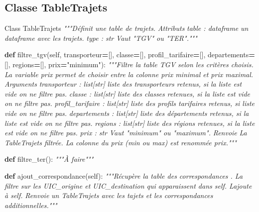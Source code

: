 \documentclass[
]{article}
\newenvironment{Shaded}{\begin{snugshade}}{\end{snugshade}}
\newcommand{\CommentTok}[1]{\textcolor[rgb]{0.56,0.35,0.01}{\textit{#1}}}
\newcommand{\KeywordTok}[1]{\textcolor[rgb]{0.13,0.29,0.53}{\textbf{#1}}}
\newcommand{\NormalTok}[1]{#1}
\newcommand{\OperatorTok}[1]{\textcolor[rgb]{0.81,0.36,0.00}{\textbf{#1}}}
\newcommand{\StringTok}[1]{\textcolor[rgb]{0.31,0.60,0.02}{#1}}
\newcommand{\VariableTok}[1]{\textcolor[rgb]{0.00,0.00,0.00}{#1}}
\begin{document}
\hypertarget{classe-tabletrajets}{%
\subsection{Classe TableTrajets}\label{classe-tabletrajets}}

\begin{Shaded}
\begin{Highlighting}[]
\NormalTok{Class TableTrajets}
  \CommentTok{"""Définit une table de trajets.}
\CommentTok{    Attributs}
\CommentTok{      table : dataframe}
\CommentTok{        un dataframe avec les trajets.}
\CommentTok{      type : str}
\CommentTok{        Vaut "TGV" ou "TER"."""}

  \KeywordTok{def}\NormalTok{ filtre\_tgv(}\VariableTok{self}\NormalTok{, transporteur}\OperatorTok{=}\NormalTok{[], classe}\OperatorTok{=}\NormalTok{[], profil\_tarifaire}\OperatorTok{=}\NormalTok{[], departements}\OperatorTok{=}\NormalTok{[], }
\NormalTok{  regions}\OperatorTok{=}\NormalTok{[], prix}\OperatorTok{=}\StringTok{"minimum"}\NormalTok{):}
    \CommentTok{"""Filtre la table TGV selon les critères choisis. La variable prix permet de choisir }
\CommentTok{    entre la colonne prix minimal et prix maximal.}
\CommentTok{        Arguments}
\CommentTok{            transporteur : list[str]}
\CommentTok{                liste des transporteurs retenus, si la liste est vide on ne filtre pas.}
\CommentTok{            classe : list[str]}
\CommentTok{              liste des classes retenues, si la liste est vide on ne filtre pas.}
\CommentTok{            profil\_tarifaire : list[str]}
\CommentTok{                liste des profils tarifaires retenus, si liste vide on ne filtre pas.}
\CommentTok{            departements : list[str]}
\CommentTok{                liste des départements retenus, si la liste est vide on ne filtre pas.}
\CommentTok{            regions : list[str]}
\CommentTok{                liste des régions retenues, si la liste est vide on ne filtre pas.}
\CommentTok{            prix : str}
\CommentTok{                Vaut "minimum" ou "maximum".}
\CommentTok{      Renvoie}
\CommentTok{          La TableTrajets filtrée. La colonne du prix (min ou max) est renommée prix."""}
        
  \KeywordTok{def}\NormalTok{ filtre\_ter():}
      \CommentTok{"""À faire"""}

  \KeywordTok{def}\NormalTok{ ajout\_correspondance(}\VariableTok{self}\NormalTok{):}
      \CommentTok{"""Récupère la table des correspondances . La filtre  sur les UIC\_origine et }
\CommentTok{      UIC\_destination qui apparaissent dans self. L\textquotesingle{}ajoute à self.}
\CommentTok{          Renvoie}
\CommentTok{            un TableTrajets avec les tajets et les correspondances additionnelles."""}
\end{Highlighting}
\end{Shaded}
\end{document}
